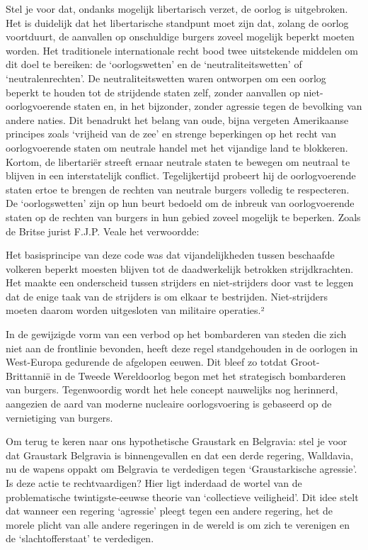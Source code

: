 \documentclass[
  a5paper,
  smalldemyvopaper,10pt,twoside,onecolumn,openright,extrafontsizes,hidelinks]{memoir}
\renewenvironment{quote}%
               {\list{}{\rightmargin=.6cm\leftmargin=.6cm}%
                \itshape \item[]}%
               {\endlist}
\begin{document}
Stel je voor dat, ondanks mogelijk libertarisch verzet, de oorlog is
uitgebroken. Het is duidelijk dat het libertarische standpunt moet zijn
dat, zolang de oorlog voortduurt, de aanvallen op onschuldige burgers
zoveel mogelijk beperkt moeten worden. Het traditionele internationale
recht bood twee uitstekende middelen om dit doel te bereiken: de
`oorlogswetten' en de `neutraliteitswetten' of `neutralenrechten'. De
neutraliteitswetten waren ontworpen om een oorlog beperkt te houden tot
de strijdende staten zelf, zonder aanvallen op niet-oorlogvoerende
staten en, in het bijzonder, zonder agressie tegen de bevolking van
andere naties. Dit benadrukt het belang van oude, bijna vergeten
Amerikaanse principes zoals `vrijheid van de zee' en strenge beperkingen
op het recht van oorlogvoerende staten om neutrale handel met het
vijandige land te blokkeren. Kortom, de libertariër streeft ernaar
neutrale staten te bewegen om neutraal te blijven in een interstatelijk
conflict. Tegelijkertijd probeert hij de oorlogvoerende staten ertoe te
brengen de rechten van neutrale burgers volledig te respecteren. De
`oorlogswetten' zijn op hun beurt bedoeld om de inbreuk van
oorlogvoerende staten op de rechten van burgers in hun gebied zoveel
mogelijk te beperken. Zoals de Britse jurist F.J.P. Veale het
verwoordde:

\begin{quote}
Het basisprincipe van deze code was dat vijandelijkheden tussen
beschaafde volkeren beperkt moesten blijven tot de daadwerkelijk
betrokken strijdkrachten. Het maakte een onderscheid tussen strijders en
niet-strijders door vast te leggen dat de enige taak van de strijders is
om elkaar te bestrijden. Niet-strijders moeten daarom worden uitgesloten
van militaire operaties.²
\end{quote}

In de gewijzigde vorm van een verbod op het bombarderen van steden die
zich niet aan de frontlinie bevonden, heeft deze regel standgehouden in
de oorlogen in West-Europa gedurende de afgelopen eeuwen. Dit bleef zo
totdat Groot-Brittannië in de Tweede Wereldoorlog begon met het
strategisch bombarderen van burgers. Tegenwoordig wordt het hele concept
nauwelijks nog herinnerd, aangezien de aard van moderne nucleaire
oorlogsvoering is gebaseerd op de vernietiging van burgers.

Om terug te keren naar ons hypothetische Graustark en Belgravia: stel je
voor dat Graustark Belgravia is binnengevallen en dat een derde
regering, Walldavia, nu de wapens oppakt om Belgravia te verdedigen
tegen `Graustarkische agressie'. Is deze actie te rechtvaardigen? Hier
ligt inderdaad de wortel van de problematische twintigste-eeuwse theorie
van `collectieve veiligheid'. Dit idee stelt dat wanneer een regering
`agressie' pleegt tegen een andere regering, het de morele plicht van
alle andere regeringen in de wereld is om zich te verenigen en de
`slachtofferstaat' te verdedigen.
\end{document}
